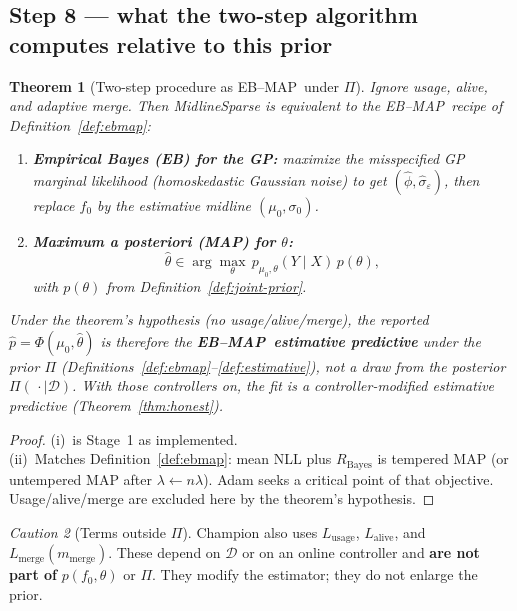 \documentclass[11pt,a4paper]{article}
\theoremstyle{plain}
\newtheorem{theorem}{Theorem}[section]
\theoremstyle{definition}
\theoremstyle{remark}
\newtheorem{caution}[theorem]{Caution}
\newcommand{\D}{\mathcal{D}}
\newcommand{\tht}{\theta}
\newcommand{\EBMAP}{EB--MAP}
\begin{document}
\subsection{Step 8 --- what the two-step algorithm computes relative to this prior}
\begin{theorem}[Two-step procedure as \EBMAP\ under \(\Pi\)]
\label{thm:eb-map}
Ignore usage, alive, and adaptive merge. Then MidlineSparse is equivalent to the
\EBMAP\ recipe of Definition~\ref{def:ebmap}:
\begin{enumerate}[label=(\roman*)]
  \item \textbf{Empirical Bayes (EB) for the GP:} maximize the \emph{misspecified} GP
        marginal likelihood (homoskedastic Gaussian noise) to get
        \((\hat\phi,\hat\sigma_\varepsilon)\), then replace \(f_0\) by the estimative
        midline \((\mu_0,\sigma_0)\).
  \item \textbf{Maximum a posteriori (MAP) for \(\tht\):}
        \[
          \hat\tht
          \in
          \arg\max_\tht\,
          p_{\mu_0,\tht}(Y\mid X)\,
          p(\tht),
        \]
        with \(p(\tht)\) from Definition~\ref{def:joint-prior}.
\end{enumerate}
Under the theorem's hypothesis (no usage/alive/merge), the reported
\(\hat p=\Phi(\mu_0,\hat\tht)\) is therefore the
\textbf{\EBMAP\ estimative predictive} under the prior \(\Pi\)
(Definitions~\ref{def:ebmap}--\ref{def:estimative}), not a draw from the posterior
\(\Pi(\,\cdot\mid\D)\).
With those controllers on, the fit is a controller-modified estimative predictive
(Theorem~\ref{thm:honest}).
\end{theorem}

\begin{proof}
(i)~is Stage~1 as implemented.\\
(ii)~Matches Definition~\ref{def:ebmap}: mean NLL plus \(R_{\mathrm{Bayes}}\) is
tempered MAP (or untempered MAP after \(\lambda\leftarrow n\lambda\)).
Adam seeks a critical point of that objective. Usage/alive/merge are excluded here
by the theorem's hypothesis.
\end{proof}

\begin{caution}[Terms outside \(\Pi\)]
Champion also uses \(L_{\mathrm{usage}}\), \(L_{\mathrm{alive}}\), and
\(L_{\mathrm{merge}}(m_{\mathrm{merge}})\). These depend on \(\D\) or on an online
controller and \textbf{are not part of} \(p(f_0,\tht)\) or \(\Pi\). They modify the
estimator; they do not enlarge the prior.
\end{caution}
\end{document}
